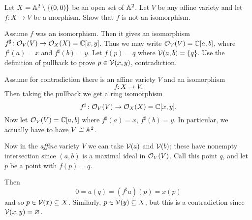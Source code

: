 \begin{problem}
	\gim
	Let $X = \mathbb A^2 \setminus \{ (0,0) \}$ be an open set of $\mathbb A^2$.
	Let $V$ be any affine variety and let $f \colon X \to V$ be a morphism.
	Show that $f$ is not an isomorphism.
	\begin{hint}
		Assume $f$ was an isomorphism.
		Then it gives an isomorphism $f^\sharp \colon \mathcal O_V(V) \to \mathcal O_X(X) = \mathbb C[x,y]$.
		Thus we may write $\mathcal O_V(V) = \mathbb C[a,b]$,
		where $f^\sharp(a) = x$ and $f^\sharp(b) = y$.
		Let $f(p) = q$ where $\mathcal V(a,b) = \{q\}$.
		Use the definition of pullback to prove $p \in \mathcal V(x,y)$, contradiction.
	\end{hint}
	\begin{sol}
		Assume for contradiction there is an affine variety $V$
		and an isomorphism
		\[ f \colon X \to V. \]
		Then taking the pullback we get a ring isomorphism
		\[ f^\sharp \colon  \mathcal O_V(V) \to \mathcal O_X(X) = \mathbb C[x,y]. \]
		Now let $\mathcal O_V(V) = \mathbb C[a,b]$ where $f^\sharp(a) = x$, $f^\sharp(b) = y$.
		In particular, we actually have to have $V \cong \mathbb A^2$.

		Now in the \emph{affine} variety $V$ we can take $\mathcal V(a)$ and $\mathcal V(b)$;
		these have nonempty intersection since $(a,b)$
		is a maximal ideal in $\mathcal O_V(V)$.
		Call this point $q$, and let $p$ be a point with $f(p) = q$.

		Then
		\[ 0 = a(q) = (f^\sharp a)(p) = x(p) \]
		and so $p \in \mathcal V(x) \subseteq X$.
		Similarly, $p \in \mathcal V(y) \subseteq X$,
		but this is a contradiction since $\mathcal V(x,y) = \varnothing$.
	\end{sol}
\end{problem}
